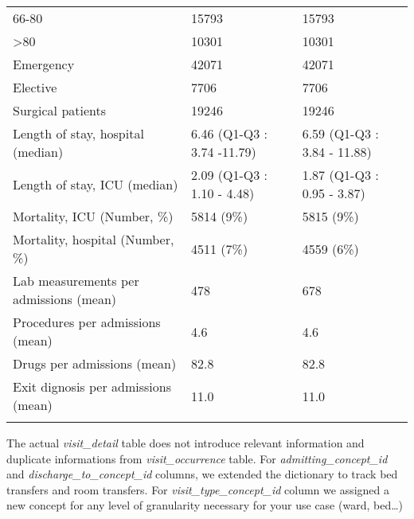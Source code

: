 \begin{table*}[t]
\begin{tabular}{@{}lll@{}}
66-80                                  & 15793                       & 15793                              \\
\textgreater{}80                       & 10301                       & 10301                              \\
Emergency                              & 42071                       & 42071                              \\
Elective                               & 7706                        & 7706                               \\
Surgical patients                      & 19246                       & 19246                              \\
Length of stay, hospital (median)      & 6.46 (Q1-Q3 : 3.74 -11.79)  & 6.59 (Q1-Q3 : 3.84 - 11.88)        \\
Length of stay, ICU (median)           & 2.09 (Q1-Q3 : 1.10 - 4.48)  & 1.87 (Q1-Q3 : 0.95 - 3.87)         \\
Mortality, ICU (Number, \%)            & 5814 (9\%)                  & 5815 (9\%)                         \\
Mortality, hospital (Number, \%)       & 4511 (7\%)                  & 4559 (6\%)                         \\
Lab measurements per admissions (mean) & 478                         & 678                                \\
Procedures per admissions (mean)       & 4.6                         & 4.6                                \\
Drugs per admissions (mean)            & 82.8                        & 82.8                               \\
Exit dignosis per admissions (mean)    & 11.0                        & 11.0                               \\\botrule
\end{tabular}
\label{table:statistics}
\end{table*}


The actual \textit{visit\_detail} table does not introduce relevant information and 
duplicate informations from \textit{visit\_occurrence} table. 
For \textit{admitting\_concept\_id} and \textit{discharge\_to\_concept\_id} columns, 
we extended the dictionary to track bed transfers and room transfers. 
For \textit{visit\_type\_concept\_id} column we assigned a new concept for any level of 
granularity necessary for your use case (ward, bed\ldots)

